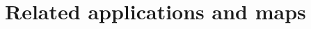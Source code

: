 







  \section{Related applications and maps}
    \label{sec:overv:applc}


%
%
%
%
%
%
%
%
%
%


